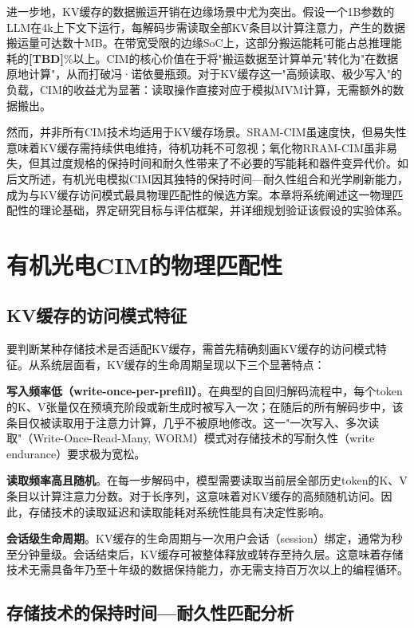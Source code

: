 进一步地，KV缓存的数据搬运开销在边缘场景中尤为突出。假设一个1B参数的LLM在4k上下文下运行，每解码步需读取全部KV条目以计算注意力，产生的数据搬运量可达数十MB。在带宽受限的边缘SoC上，这部分搬运能耗可能占总推理能耗的\textbf{[TBD]}\%以上。CIM的核心价值在于将"搬运数据至计算单元"转化为"在数据原地计算"，从而打破冯·诺依曼瓶颈。对于KV缓存这一"高频读取、极少写入"的负载，CIM的收益尤为显著：读取操作直接对应于模拟MVM计算，无需额外的数据搬出。

然而，并非所有CIM技术均适用于KV缓存场景。SRAM-CIM虽速度快，但易失性意味着KV缓存需持续供电维持，待机功耗不可忽视；氧化物RRAM-CIM虽非易失，但其过度规格的保持时间和耐久性带来了不必要的写能耗和器件变异代价。如后文所述，有机光电模拟CIM因其独特的保持时间—耐久性组合和光学刷新能力，成为与KV缓存访问模式最具物理匹配性的候选方案。本章将系统阐述这一物理匹配性的理论基础，界定研究目标与评估框架，并详细规划验证该假设的实验体系。


\section{有机光电CIM的物理匹配性}
\label{sec:work2_physics_match}

\subsection{KV缓存的访问模式特征}

要判断某种存储技术是否适配KV缓存，需首先精确刻画KV缓存的访问模式特征。从系统层面看，KV缓存的生命周期呈现以下三个显著特点：

\textbf{写入频率低（write-once-per-prefill）}。在典型的自回归解码流程中，每个token的K、V张量仅在预填充阶段或新生成时被写入一次；在随后的所有解码步中，该条目仅被读取用于注意力计算，几乎不被原地修改。这一"一次写入、多次读取"（Write-Once-Read-Many, WORM）模式对存储技术的写耐久性（write endurance）要求极为宽松。

\textbf{读取频率高且随机}。在每一步解码中，模型需要读取当前层全部历史token的K、V条目以计算注意力分数。对于长序列，这意味着对KV缓存的高频随机访问。因此，存储技术的读取延迟和读取能耗对系统性能具有决定性影响。

\textbf{会话级生命周期}。KV缓存的生命周期与一次用户会话（session）绑定，通常为秒至分钟量级。会话结束后，KV缓存可被整体释放或转存至持久层。这意味着存储技术无需具备年乃至十年级的数据保持能力，亦无需支持百万次以上的编程循环。

\subsection{存储技术的保持时间—耐久性匹配分析}

